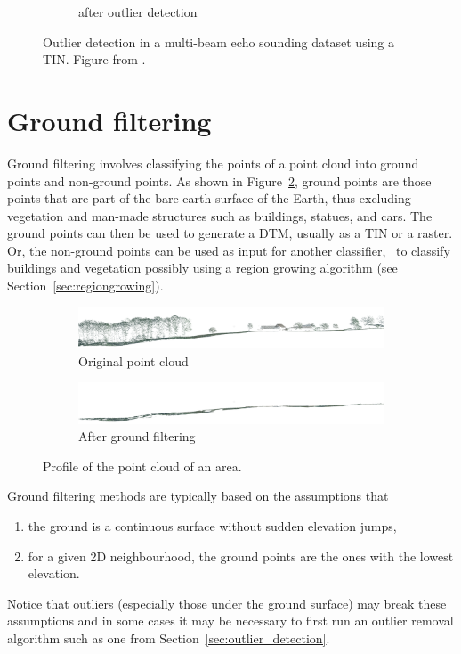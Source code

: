 \begin{figure}
\begin{subfigure}[b]{0.44\linewidth}
    \caption{after outlier detection}
  \end{subfigure}
\caption{Outlier detection in a multi-beam echo sounding dataset using a TIN\@. Figure from \citep{Arge10}.}%
\label{fig:mbes}
\end{figure}



%
\section{Ground filtering}

Ground filtering involves classifying the points of a point cloud into ground points and non-ground points.
As shown in Figure~\ref{fig:filter-profile}, ground points are those points that are part of the bare-earth surface of the Earth, thus excluding vegetation and man-made structures such as buildings, statues, and cars.
The ground points can then be used to generate a DTM, usually as a TIN or a raster.
Or, the non-ground points can be used as input for another classifier, \eg\ to classify buildings and vegetation possibly using a region growing algorithm (see Section~\ref{sec:regiongrowing}).
\begin{figure}
  \centering
  \begin{subfigure}[b]{\linewidth}
    \centering
    \includegraphics[width=\textwidth]{filter-profile-before.png}
    \caption{Original point cloud}
  \end{subfigure}
  \begin{subfigure}[b]{\linewidth}
    \centering
    \includegraphics[width=\textwidth]{filter-profile-after.png}
    \caption{After ground filtering}
  \end{subfigure}
  \caption{Profile of the point cloud of an area.}%
  \label{fig:filter-profile}
\end{figure}

%

Ground filtering methods are typically based on the assumptions that 
\begin{enumerate}
  \item the ground is a continuous surface without sudden elevation jumps, 
  \item for a given 2D neighbourhood, the ground points are the ones with the lowest elevation.
\end{enumerate}
Notice that outliers (especially those under the ground surface) may break these assumptions and in some cases it may be necessary to first run an outlier removal algorithm such as one from Section~\ref{sec:outlier_detection}.

